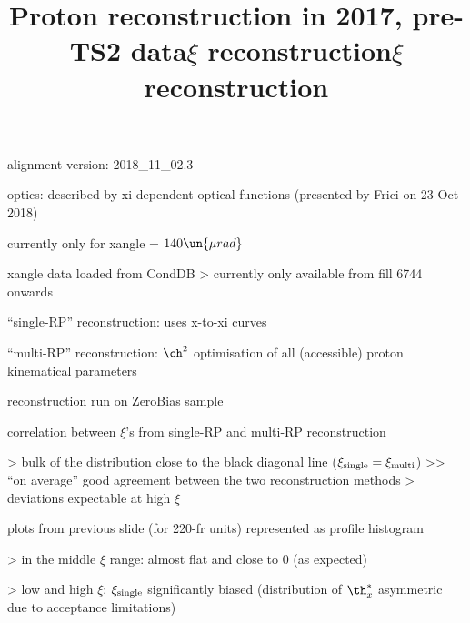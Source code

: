 


\newpage %

\def\author{J.~Kašpar}
\def\caption{Proton reconstruction, 2017, pre-TS2}
\def\date{2 Nov 2018}

\newpage %
\title{Proton reconstruction in 2017, pre-TS2 data}

\> alignment version: 2018\_11\_02.3

\> optics: described by xi-dependent optical functions (presented by Frici on 23 Oct 2018)

\> currently only for xangle = $140\un{\mu rad}$

\> xangle data loaded from CondDB
\>> currently only available from fill 6744 onwards

\> ``single-RP'' reconstruction: uses x-to-xi curves

\> ``multi-RP'' reconstruction: $\ch^2$ optimisation of all (accessible) proton kinematical parameters

\> reconstruction run on ZeroBias sample



\newpage %
\title{$\xi$ reconstruction}

\> correlation between $\xi$'s from single-RP and multi-RP reconstruction

\centerline{}

\>> bulk of the distribution close to the black diagonal line ($\xi_{\rm single} = \xi_{\rm multi}$)
\>>> ``on average'' good agreement between the two reconstruction methods
\>> deviations expectable at high $\xi$


\newpage %
\title{$\xi$ reconstruction}

\> plots from previous slide (for 220-fr units) represented as profile histogram

\centerline{}

\>> in the middle $\xi$ range: almost flat and close to 0 (as expected)

\>> low and high $\xi$: $\xi_{\rm single}$ significantly biased (distribution of $\th^*_x$ asymmetric due to acceptance limitations)



